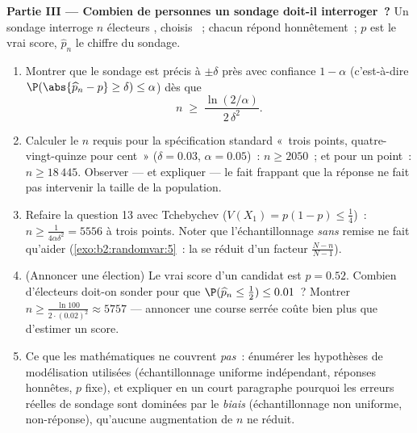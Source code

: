 \begin{problem}
\medskip
\noindent\textbf{Partie III --- Combien de personnes un sondage
doit-il interroger~?} Un sondage interroge $n$ électeurs ,
choisis ~; chacun répond honnêtement~; $p$ est le vrai score, $\widehat p_n$
le chiffre du sondage.
\begin{enumerate}[resume]
  \item Montrer que le sondage est précis à $\pm\delta$ près avec
        confiance $1 - \alpha$ (c'est-à-dire
        $\P(\abs{\widehat p_n - p} \geq \delta) \leq \alpha$)
        dès que
        \[
        n \;\geq\; \frac{\ln(2/\alpha)}{2\,\delta^2} .
        \]
  \item Calculer le $n$ requis pour la spécification standard «~trois
        points, quatre-vingt-quinze pour cent~» ($\delta
        = 0.03$, $\alpha = 0.05$)~: $n \geq 2050$~; et pour un
        point~: $n \geq 18\,445$. Observer --- et expliquer ---
        le fait frappant que la réponse ne fait pas intervenir
        la taille de la population.
  \item Refaire la question 13 avec Tchebychev ($V(X_1) = p(1-p)
        \leq \frac14$)~: $n \geq \frac1{4\alpha\delta^2} =
        5556$ à trois points. Noter que l'échantillonnage
        \emph{sans} remise ne fait qu'aider
        (\cref{exo:b2:randomvar:5}~: la  se réduit d'un facteur
        $\frac{N-n}{N-1}$).
  \item (Annoncer une élection) Le vrai score d'un candidat est $p
        = 0.52$. Combien d'électeurs doit-on sonder pour que
        $\P(\widehat p_n \leq \tfrac12) \leq 0.01$~? Montrer $n
        \geq \frac{\ln 100}{2\cdot(0.02)^2} \approx 5757$ ---
        annoncer une course serrée coûte bien plus que d'estimer un
        score.
  \item Ce que les mathématiques ne couvrent \emph{pas}~: énumérer les
        hypothèses de modélisation utilisées (échantillonnage
        uniforme indépendant, réponses honnêtes, $p$ fixe), et expliquer en
        un court paragraphe pourquoi les erreurs réelles de sondage sont
        dominées par le \emph{biais} (échantillonnage non uniforme,
        non-réponse), qu'aucune augmentation de $n$ ne réduit.
\end{enumerate}


\end{problem}
